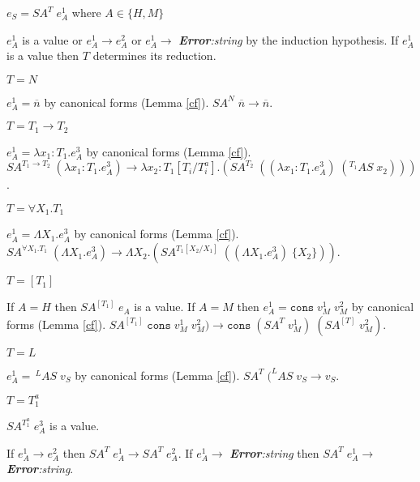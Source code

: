 \begin{case}
$e_{S}=SA^{T}\;e_{A}^{1}$ where $A\in\lbrace H,M\rbrace$

$e_{A}^{1}$ is a value or $e_{A}^{1}\rightarrow e_{A}^{2}$ or $e_{A}^{1}\rightarrow$ \emph{\textbf{Error}:\;string} by the induction hypothesis.  If $e_{A}^{1}$ is a value then $T$ determines its reduction.
\begin{subcase}
$T=N$

$e_{A}^{1}=\overline{n}$ by canonical forms (Lemma \ref{cf}).  $SA^{N}\;\overline{n}\rightarrow\overline{n}$.
\end{subcase}
\begin{subcase}
$T=T_{1}\rightarrow T_{2}$

$e_{A}^{1}=\lambda x_{1}:T_{1}.e_{A}^{3}$ by canonical forms (Lemma \ref{cf}).  $SA^{T_{1}\rightarrow T_{2}}\;(\lambda x_{1}:T_{1}.e_{A}^{3})\rightarrow\lambda x_{2}:T_{1}[T_{i}/T^{a}_{i}].(SA^{T_{2}}\;((\lambda x_{1}:T_{1}.e_{A}^{3})\;(^{T_{1}}AS\;x_{2})))$.
\end{subcase}
\begin{subcase}
$T=\forall X_{1}.T_{1}$

$e_{A}^{1}=\Lambda X_{1}.e_{A}^{3}$ by canonical forms (Lemma \ref{cf}).  $SA^{\forall X_{1}.T_{1}}\;(\Lambda X_{1}.e_{A}^{3})\rightarrow\Lambda X_{2}.(SA^{T_{1}[X_{2}/X_{1}]}\;((\Lambda X_{1}.e_{A}^{3})\;\lbrace X_{2}\rbrace))$.
\end{subcase}
\begin{subcase}
$T=[T_{1}]$

If $A=H$ then $SA^{[T_{1}]}\;e_{A}$ is a value.  If $A=M$ then $e_{A}^{1}=\mathtt{cons}\;v_{M}^{1}\;v_{M}^{2}$ by canonical forms (Lemma \ref{cf}).  $SA^{[T_{1}]}\;\mathtt{cons}\;v_{M}^{1}\;v_{M}^{2})\rightarrow\mathtt{cons}\;(SA^{T}\;v_{M}^{1})\;(SA^{[T]}\;v_{M}^{2})$.
\end{subcase}
\begin{subcase}
$T=L$

$e_{A}^{1}=\,^{L}AS\;v_{S}$ by canonical forms (Lemma \ref{cf}).  $SA^{T}\;(^{L}AS\;v_{S}\rightarrow v_{S}$.
\end{subcase}
\begin{subcase}
$T=T_{1}^{a}$

$SA^{T_{1}^{a}}\;e_{A}^{3}$ is a value.
\end{subcase}
If $e_{A}^{1}\rightarrow e_{A}^{2}$ then $SA^{T}\;e_{A}^{1}\rightarrow SA^{T}\;e_{A}^{2}$.  If $e_{A}^{1}\rightarrow$ \emph{\textbf{Error}:\;string} then $SA^{T}\;e_{A}^{1}\rightarrow$ \emph{\textbf{Error}:\;string}.
\end{case}
